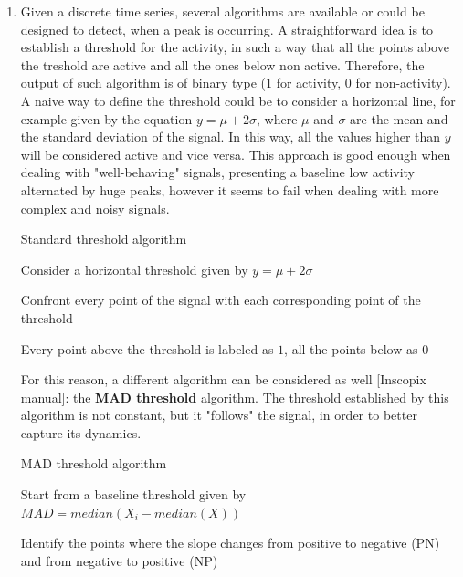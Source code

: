 \documentclass[12pt, a4paper]{article}
\begin{document}
\begin{enumerate}
	
	\item  Given a discrete time series, several algorithms are available or could be designed to detect, when a peak is occurring. A straightforward idea is to establish a threshold for the activity, in such a way that all the points above the treshold are active and all the ones below non active. Therefore, the output of such algorithm is of binary type ($1$ for activity, $0$ for non-activity).\\
	A naive way to define the threshold could be to consider a horizontal line, for example given by the equation $ y = \mu + 2\sigma $,	where $\mu$ and $\sigma$ are the mean and the standard deviation of the signal. In this way, all the values higher than $y$ will be considered active and vice versa. This approach is good enough when dealing with "well-behaving" signals, presenting a baseline low activity alternated by huge peaks, however it seems to fail when dealing with more complex and noisy signals.\\
	\begin{algorithm}
		\caption{Standard threshold algorithm}\label{tresh}
		\begin{algorithmic}[1]
			
			
			\State Consider a horizontal threshold given by $ y = \mu + 2\sigma $
			
			\State Confront every point of the signal with each corresponding point of the threshold
			
			\State Every point above the threshold is labeled as $1$, all the points below as $0$
		\end{algorithmic}
	\end{algorithm}
	
	
	For this reason, a different algorithm can be considered as well [Inscopix manual]: the \textbf{MAD threshold} algorithm. The threshold established by this algorithm is not constant, but it "follows" the signal, in order to better capture its dynamics.\\

	
	
	\begin{algorithm}
		\caption{MAD threshold algorithm}\label{mad}
		\begin{algorithmic}[1]
			
			
			\State Start from a baseline threshold given by $ MAD = median(X_i - median(X))$
			
			\State Identify the points where the slope changes from positive to negative (PN) and from negative to positive (NP)
			

\end{algorithmic}
\end{algorithm}
\end{enumerate}
\end{document}
